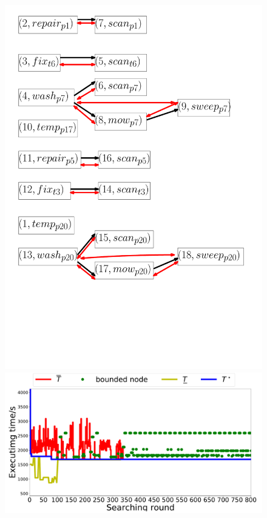\begin{figure}[t!]

  \begin{minipage}[t]{0.22\linewidth}
   \centering %
	\includegraphics[height =1.2\textwidth]{figures/simulation/task3/ipe_poset_graph.pdf}

\end{minipage}%
  \begin{minipage}[t]{0.37\linewidth}
    \centering
	\includegraphics[width =1.10\textwidth]{figures/simulation/task3/bnb_search4.pdf}


\end{minipage}
\end{figure}
